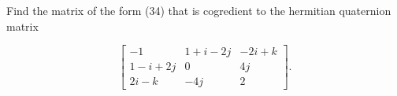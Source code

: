 Find the matrix of the form (34) that is cogredient to the hermitian quaternion matrix

$$\begin{bmatrix}
-1 & 1 + i - 2j & -2i + k \\
1 - i + 2j & 0 & 4j \\
2i - k & -4j & 2
\end{bmatrix}.$$
